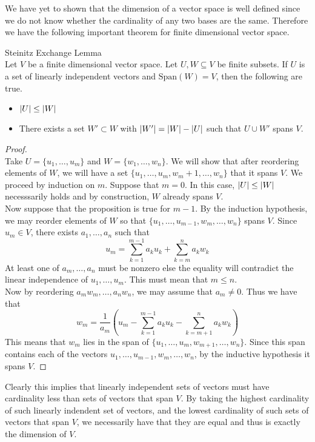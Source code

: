 \documentclass[a4paper]{article}
\begin{document}
We have yet to shown that the dimension of a vector space is well defined since we do not know whether the cardinality of any two bases are the same. Therefore we have the following important theorem for finite dimensional vector space. 

\begin{thm}{Steinitz Exchange Lemma}{}\\
Let $V$ be a finite dimensional vector space. Let $U,W\subseteq V$ be finite subsets. If $U$ is a set of linearly independent vectors and $\text{Span}(W)=V$, then the following are true. 
\begin{itemize}
\item $\abs{U}\leq\abs{W}$
\item There exists a set $W'\subset W$ with $\abs{W'}=\abs{W}-\abs{U}$ such that $U\cup W'$ spans $V$. 
\end{itemize} 
\begin{proof}\\
Take $U=\{u_1,\dots,u_m\}$ and $W=\{w_1,\dots,w_n\}$. We will show that after reordering elements of $W$, we will have a set $\{u_1,\dots,u_m,w_m+1,\dots,w_n\}$ that it spans $V$. We proceed by induction on $m$. Suppose that $m=0$. In this case, $\abs{U}\leq\abs{W}$ necesssarily holds and by construction, $W$ already spans $V$. \\
Now suppose that the proposition is true for $m-1$. By the induction hypothesis, we may reorder elements of $W$ so that $\{u_1,\dots,u_{m-1},w_m,\dots,w_n\}$ spans $V$. Since $u_m\in V$, there exists $a_1,\dots,a_n$ such that $$u_m=\sum_{k=1}^{m-1}a_ku_k+\sum_{k=m}^na_kw_k$$ At least one of $a_m,\dots,a_n$ must be nonzero else the equality will contradict the linear independence of $u_1,\dots,u_m$. This must mean that $m\leq n$. \\
Now by reordering $a_mw_m,\dots,a_nw_n$, we may assume that $a_m\neq 0$. Thus we have that $$w_m=\frac{1}{a_m}\left(u_m-\sum_{k=1}^{m-1}a_ku_k-\sum_{k=m+1}^na_kw_k\right)$$ This means that $w_m$ lies in the span of $\{u_1,\dots,u_m,w_{m+1},\dots,w_n\}$. Since this span contains each of the vectors $u_1,\dots,u_{m-1},w_m,\dots,w_n$, by the inductive hypothesis it spans $V$. 
\end{proof}
\end{thm}

Clearly this implies that linearly independent sets of vectors must have cardinality less than sets of vectors that span $V$. By taking the highest cardinality of such linearly indendent set of vectors, and the lowest cardinality of such sets of vectors that span $V$, we necessarily have that they are equal and thus is exactly the dimension of $V$. \\
\end{document}
